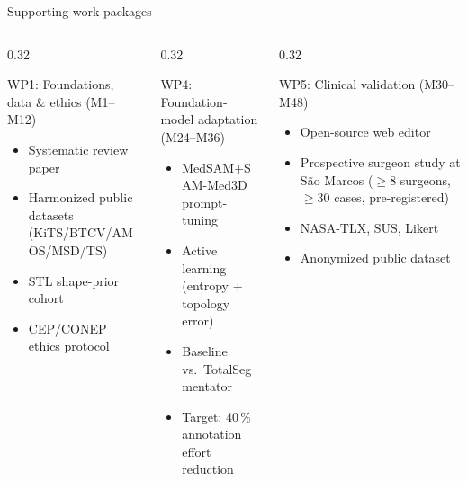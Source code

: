 \documentclass[aspectratio=169,11pt,xcolor=table]{beamer}
\begin{document}
\begin{frame}{Supporting work packages}
\scriptsize
\begin{columns}[T]
\begin{column}{0.32\linewidth}
\begin{block}{WP1: Foundations, data \& ethics (M1--M12)}
\scriptsize
\begin{itemize}
\setlength\itemsep{1pt}
\item Systematic review paper
\item Harmonized public datasets (KiTS/BTCV/AMOS/MSD/TS)
\item STL shape-prior cohort
\item CEP/CONEP ethics protocol
\end{itemize}
\end{block}
\end{column}
\begin{column}{0.32\linewidth}
\begin{block}{WP4: Foundation-model adaptation (M24--M36)}
\scriptsize
\begin{itemize}
\setlength\itemsep{1pt}
\item MedSAM+SAM-Med3D prompt-tuning
\item Active learning (entropy + topology error)
\item Baseline vs.\ TotalSegmentator
\item Target: 40\,\% annotation effort reduction
\end{itemize}
\end{block}
\end{column}
\begin{column}{0.32\linewidth}
\begin{block}{WP5: Clinical validation (M30--M48)}
\scriptsize
\begin{itemize}
\setlength\itemsep{1pt}
\item Open-source web editor
\item Prospective surgeon study at São Marcos ($\ge 8$ surgeons, $\ge 30$ cases, pre-registered)
\item NASA-TLX, SUS, Likert
\item Anonymized public dataset
\end{itemize}
\end{block}
\end{column}
\end{columns}
\end{frame}
\end{document}
